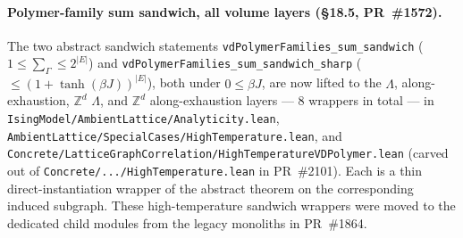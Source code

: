 \documentclass[a4paper,11pt]{article}
\begin{document}
\paragraph{Polymer-family sum sandwich, all volume layers
(\S18.5, PR~\#1572).} The two abstract sandwich statements
\texttt{vdPolymerFamilies\_sum\_sandwich} ($1 \le \sum_\Gamma \le
2^{|E|}$) and \texttt{vdPolymerFamilies\_sum\_sandwich\_sharp}
($\le (1 + \tanh(\beta J))^{|E|}$), both under $0 \le \beta J$,
are now lifted to the $\Lambda$, along-exhaustion, $\mathbb{Z}^d$
$\Lambda$, and $\mathbb{Z}^d$ along-exhaustion layers --- $8$
wrappers in total --- in
\texttt{IsingModel/AmbientLattice/Analyticity.lean},
\texttt{AmbientLattice/SpecialCases/HighTemperature.lean}, and
\texttt{Concrete/LatticeGraphCorrelation/HighTemperatureVDPolymer.lean}
(carved out of \texttt{Concrete/.../HighTemperature.lean} in PR~\#2101).
Each is a thin direct-instantiation wrapper of the abstract theorem on
the corresponding induced subgraph. These high-temperature sandwich
wrappers were moved to the dedicated child modules from the legacy
monoliths in PR~\#1864.
\end{document}
